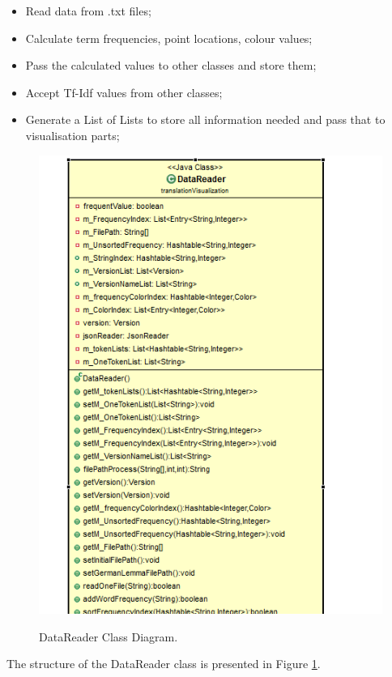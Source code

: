 \begin{itemize}
	\item \textbf{}Read data from .txt files;
	\item \textbf{}Calculate term frequencies, point locations, colour values; 
	\item \textbf{}Pass the calculated values to other classes and store them;
	\item \textbf{}Accept Tf-Idf values from other classes;
	\item \textbf{}Generate a List of Lists to store all information needed and pass that to visualisation parts;
\end{itemize} 
\begin{figure}[H]
	\centering    
	\includegraphics[scale=0.6]{Figs/DataReader}\\[1ex]
	\caption{DataReader Class Diagram. }
	\label{fig:dataReader}
\end{figure}

The structure of the DataReader class is presented in Figure \ref{fig:dataReader}.

